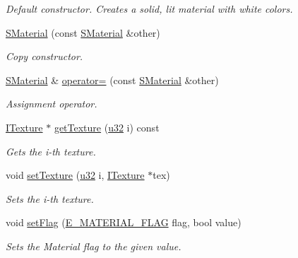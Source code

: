 \begin{DoxyCompactItemize}
\begin{DoxyCompactList}\small\item\em Default constructor. Creates a solid, lit material with white colors. \end{DoxyCompactList}\item 
\hyperlink{classirr_1_1video_1_1SMaterial_a66f175294b99e3cc2816e9cc0f372ce3}{S\+Material} (const \hyperlink{classirr_1_1video_1_1SMaterial}{S\+Material} \&other)
\begin{DoxyCompactList}\small\item\em Copy constructor. \end{DoxyCompactList}\item 
\hyperlink{classirr_1_1video_1_1SMaterial}{S\+Material} \& \hyperlink{classirr_1_1video_1_1SMaterial_a752ea337daa705d8d7035f0ee93d178d}{operator=} (const \hyperlink{classirr_1_1video_1_1SMaterial}{S\+Material} \&other)
\begin{DoxyCompactList}\small\item\em Assignment operator. \end{DoxyCompactList}\item 
\hyperlink{classirr_1_1video_1_1ITexture}{I\+Texture} $\ast$ \hyperlink{classirr_1_1video_1_1SMaterial_a14f940e986da1150678fb0f039355d48}{get\+Texture} (\hyperlink{namespaceirr_a0416a53257075833e7002efd0a18e804}{u32} i) const 
\begin{DoxyCompactList}\small\item\em Gets the i-\/th texture. \end{DoxyCompactList}\item 
void \hyperlink{classirr_1_1video_1_1SMaterial_a44dc38e7d4a78434d12ffd02e88e3d60}{set\+Texture} (\hyperlink{namespaceirr_a0416a53257075833e7002efd0a18e804}{u32} i, \hyperlink{classirr_1_1video_1_1ITexture}{I\+Texture} $\ast$tex)
\begin{DoxyCompactList}\small\item\em Sets the i-\/th texture. \end{DoxyCompactList}\item 
void \hyperlink{classirr_1_1video_1_1SMaterial_a460db947d8e2022c6be895b77a65bbda}{set\+Flag} (\hyperlink{namespaceirr_1_1video_a8a3bc00ae8137535b9fbc5f40add70d3}{E\+\_\+\+M\+A\+T\+E\+R\+I\+A\+L\+\_\+\+F\+L\+AG} flag, bool value)
\begin{DoxyCompactList}\small\item\em Sets the Material flag to the given value. \end{DoxyCompactList}\item 

\end{DoxyCompactItemize}
